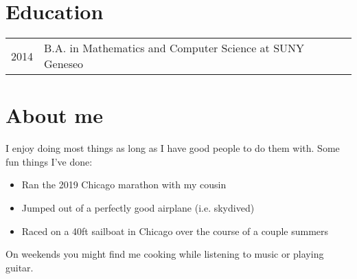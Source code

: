 \documentclass[a4paper,10pt]{article}
\begin{document}
\section{Education}
\begin{tabular}{rl}
  \textsc{2014} & B.A. in Mathematics and Computer Science at SUNY Geneseo
\end{tabular}

\section{About me}
I enjoy doing most things as long as I have good people to do them with. Some fun things I've done:
\begin{itemize}
  \item Ran the 2019 Chicago marathon with my cousin
  \item Jumped out of a perfectly good airplane (i.e. skydived)
  \item Raced on a 40ft sailboat in Chicago over the course of a couple summers
\end{itemize}

On weekends you might find me cooking while listening to music or playing guitar.
\end{document}
